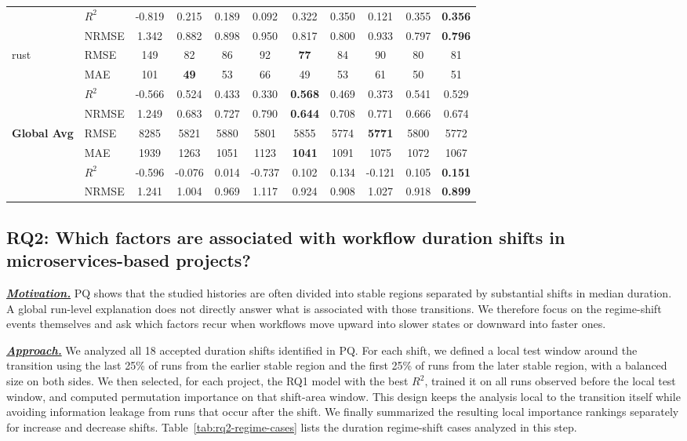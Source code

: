 \documentclass[conference]{IEEEconf}
\begin{document}
\begin{table}[!tbp]
\begin{tabular}{llccccccccc}
  & $R^2$ & -0.819 & 0.215 & 0.189 & 0.092 & 0.322 & 0.350 & 0.121 & 0.355 & \textbf{0.356} \\
  & NRMSE & 1.342 & 0.882 & 0.898 & 0.950 & 0.817 & 0.800 & 0.933 & 0.797 & \textbf{0.796} \\
\midrule
\multirow{4}{*}{rust} & RMSE & 149 & 82 & 86 & 92 & \textbf{77} & 84 & 90 & 80 & 81 \\
  & MAE & 101 & \textbf{49} & 53 & 66 & 49 & 53 & 61 & 50 & 51 \\
  & $R^2$ & -0.566 & 0.524 & 0.433 & 0.330 & \textbf{0.568} & 0.469 & 0.373 & 0.541 & 0.529 \\
  & NRMSE & 1.249 & 0.683 & 0.727 & 0.790 & \textbf{0.644} & 0.708 & 0.771 & 0.666 & 0.674 \\
\midrule
\multirow{4}{*}{\textbf{Global Avg}} & RMSE & 8285 & 5821 & 5880 & 5801 & 5855 & 5774 & \textbf{5771} & 5800 & 5772 \\
  & MAE & 1939 & 1263 & 1051 & 1123 & \textbf{1041} & 1091 & 1075 & 1072 & 1067 \\
  & $R^2$ & -0.596 & -0.076 & 0.014 & -0.737 & 0.102 & 0.134 & -0.121 & 0.105 & \textbf{0.151} \\
  & NRMSE & 1.241 & 1.004 & 0.969 & 1.117 & 0.924 & 0.908 & 1.027 & 0.918 & \textbf{0.899} \\
\bottomrule
\end{tabular}
\end{table}

\subsection{RQ2: Which factors are associated with workflow duration shifts in microservices-based projects?}
\noindent\underline{\textbf{\textit{Motivation.}}} PQ shows that the studied histories are often divided into stable regions separated by substantial shifts in median duration. A global run-level explanation does not directly answer what is associated with those transitions. We therefore focus on the regime-shift events themselves and ask which factors recur when workflows move upward into slower states or downward into faster ones.

\noindent\underline{\textbf{\textit{Approach.}}} We analyzed all 18 accepted duration shifts identified in PQ. For each shift, we defined a local test window around the transition using the last 25\% of runs from the earlier stable region and the first 25\% of runs from the later stable region, with a balanced size on both sides. We then selected, for each project, the RQ1 model with the best $R^2$, trained it on all runs observed before the local test window, and computed permutation importance on that shift-area window. This design keeps the analysis local to the transition itself while avoiding information leakage from runs that occur after the shift. We finally summarized the resulting local importance rankings separately for increase and decrease shifts. Table~\ref{tab:rq2-regime-cases} lists the duration regime-shift cases analyzed in this step.
\end{document}
